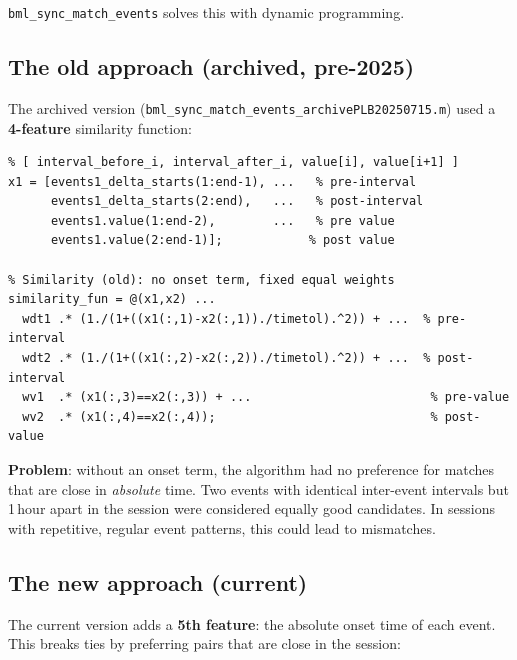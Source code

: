 \documentclass[11pt, a4paper]{article}
\begin{document}
\texttt{bml\_sync\_match\_events} solves this with dynamic programming.

\subsection{The old approach (archived, pre-2025)}

The archived version (\texttt{bml\_sync\_match\_events\_archivePLB20250715.m}) used a \textbf{4-feature} similarity function:

\begin{lstlisting}[style=matlab, caption={Old 4-feature similarity (archived)}]
% Feature vector for event i (4 features):
% [ interval_before_i, interval_after_i, value[i], value[i+1] ]
x1 = [events1_delta_starts(1:end-1), ...   % pre-interval
      events1_delta_starts(2:end),   ...   % post-interval
      events1.value(1:end-2),        ...   % pre value
      events1.value(2:end-1)];            % post value

% Similarity (old): no onset term, fixed equal weights
similarity_fun = @(x1,x2) ...
  wdt1 .* (1./(1+((x1(:,1)-x2(:,1))./timetol).^2)) + ...  % pre-interval
  wdt2 .* (1./(1+((x1(:,2)-x2(:,2))./timetol).^2)) + ...  % post-interval
  wv1  .* (x1(:,3)==x2(:,3)) + ...                         % pre-value
  wv2  .* (x1(:,4)==x2(:,4));                              % post-value
\end{lstlisting}

\textbf{Problem}: without an onset term, the algorithm had no preference for matches that are close in \emph{absolute} time. Two events with identical inter-event intervals but 1\,hour apart in the session were considered equally good candidates. In sessions with repetitive, regular event patterns, this could lead to mismatches.

\subsection{The new approach (current)}

The current version adds a \textbf{5th feature}: the absolute onset time of each event. This breaks ties by preferring pairs that are close in the session:
\end{document}
